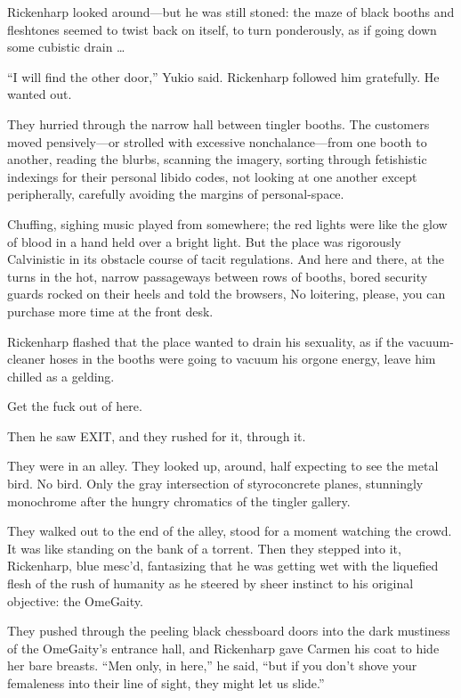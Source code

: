 Rickenharp looked around—but he was still stoned: the maze of black booths and fleshtones seemed to twist back on itself, to turn ponderously, as if going down some cubistic drain …

“I will find the other door,” Yukio said. Rickenharp followed him gratefully. He wanted out.

They hurried through the narrow hall between tingler booths. The customers moved pensively—or strolled with excessive nonchalance—from one booth to another, reading the blurbs, scanning the imagery, sorting through fetishistic indexings for their personal libido codes, not looking at one another except peripherally, carefully avoiding the margins of personal-space.

Chuffing, sighing music played from somewhere; the red lights were like the glow of blood in a hand held over a bright light. But the place was rigorously Calvinistic in its obstacle course of tacit regulations. And here and there, at the turns in the hot, narrow passageways between rows of booths, bored security guards rocked on their heels and told the browsers, No loitering, please, you can purchase more time at the front desk.

Rickenharp flashed that the place wanted to drain his sexuality, as if the vacuum-cleaner hoses in the booths were going to vacuum his orgone energy, leave him chilled as a gelding.

Get the fuck out of here.

Then he saw EXIT, and they rushed for it, through it.

They were in an alley. They looked up, around, half expecting to see the metal bird. No bird. Only the gray intersection of styroconcrete planes, stunningly monochrome after the hungry chromatics of the tingler gallery.

They walked out to the end of the alley, stood for a moment watching the crowd. It was like standing on the bank of a torrent. Then they stepped into it, Rickenharp, blue mesc’d, fantasizing that he was getting wet with the liquefied flesh of the rush of humanity as he steered by sheer instinct to his original objective: the OmeGaity.

They pushed through the peeling black chessboard doors into the dark mustiness of the OmeGaity’s entrance hall, and Rickenharp gave Carmen his coat to hide her bare breasts. “Men only, in here,” he said, “but if you don’t shove your femaleness into their line of sight, they might let us slide.”

